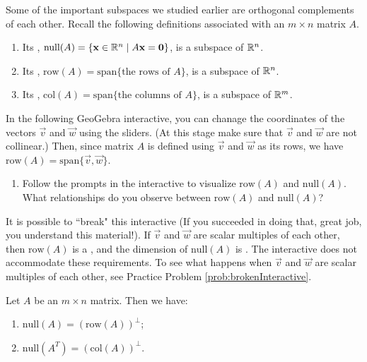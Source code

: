 \documentclass{ximera}
\begin{document}
Some of the important subspaces we studied earlier are orthogonal complements of each other.  Recall the following definitions associated with an $m \times n$ matrix $A$.
\begin{enumerate}
    \item Its , $\mbox{null}(A) = \{\mathbf{x}\in \mathbb{R}^n \mid A\mathbf{x} = \mathbf{0}\}$, is a subspace of $\mathbb{R}^n$.
    \item Its , $\mbox{row}(A) = \mbox{span} \{ \mbox{the rows of } A\}$, is a subspace of $\mathbb{R}^n$.
    \item Its , $\mbox{col}(A) = \mbox{span} \{ \mbox{the columns of } A\}$, is a subspace of $\mathbb{R}^m$.
\end{enumerate}

\begin{exploration}
In the following GeoGebra interactive, you can chanage the coordinates of the vectors $\vec{v}$ and $\vec{w}$ using the sliders.  (At this stage make sure that $\vec{v}$ and $\vec{w}$ are not collinear.) Then, since matrix $A$ is defined using $\vec{v}$ and $\vec{w}$ as its rows, we have $\mbox{row}(A) = \mbox{span}\{\vec{v},\vec{w}\}$.  
   
\begin{center}
\end{center}

\begin{enumerate}
        \item Follow the prompts in the interactive to visualize $\mbox{row}(A)$ and $\mbox{null}(A)$.  What relationships do you observe between $\mbox{row}(A)$ and $\mbox{null}(A)$? 
        \end{enumerate}

  It is possible to ``break" this interactive (If you succeeded in doing that, great job, you understand this material!). If $\vec{v}$ and $\vec{w}$ are scalar multiples of each other, then $\mbox{row}(A)$ is a , and the dimension of $\mbox{null}(A)$ is .  The interactive does not accommodate these requirements.  To see what happens when $\vec{v}$ and $\vec{w}$ are scalar multiples of each other, see Practice Problem \ref{prob:brokenInteractive}.
\end{exploration}


\begin{theorem}\label{th:4subspaces}
Let $A$ be an $m \times n$ matrix.  Then we have:
\begin{enumerate}
\item\label{th:4subspacesa} $\mbox{null}(A) = (\mbox{row}(A))^\perp$;
\item\label{th:4subspacesb} $\mbox{null}(A^T) = (\mbox{col}(A))^\perp$.
\end{enumerate}
\end{theorem}
\end{document}
